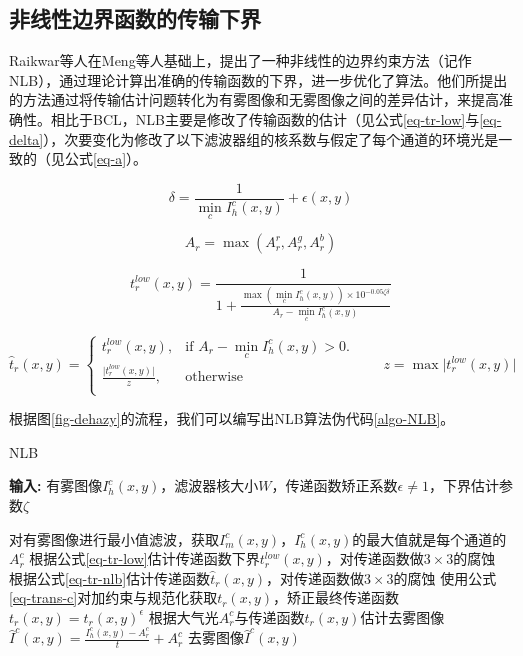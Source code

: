 \subsection{非线性边界函数的传输下界}
Raikwar等人\cite{raikwar.tapaswi2020}在Meng等人\cite{meng.pan201312}基础上，提出了一种非线性的边界约束方法（记作NLB），通过理论计算出准确的传输函数的下界，进一步优化了算法。他们所提出的方法通过将传输估计问题转化为有雾图像和无雾图像之间的差异估计，来提高准确性。相比于BCL，NLB主要是修改了传输函数的估计（见公式\eqref{eq-tr-low}与\eqref{eq-delta}），次要变化为修改了以下滤波器组的核系数与假定了每个通道的环境光是一致的（见公式\eqref{eq-a}）。

\begin{equation}
    \delta = \frac{1}{\min\limits_{c}I_h^c(x,y)} + \epsilon(x,y)
    \label{eq-delta}
\end{equation}

\begin{equation}
    A_r = \max{(A_r^r,A_r^g,A_r^b)}
    \label{eq-a}
\end{equation}

\begin{equation}
    t_r^{low}(x,y) = \frac{1}{1 + \frac{\max{(\min\limits_{c}I_h^c(x,y))}\times 10^{-0.05\zeta\delta}}{A_r - \min\limits_{c}I_h^c(x,y)}}
    \label{eq-tr-low}
\end{equation}

\begin{equation}
    \hat t_r(x,y) = \left\{\begin{matrix}t_r^{low}(x,y), & \text{if } A_r - \min\limits_{c}I_h^c(x,y) > 0.\\
        \frac{\lvert t_r^{low}(x,y) \rvert}{z}, & \text{otherwise}\\\end{matrix}\right. \qquad z = \max \lvert t_r^{low}(x,y) \rvert
    \label{eq-tr-nlb}
\end{equation}

根据图\ref{fig-dehazy}的流程，我们可以编写出NLB算法伪代码\ref{algo-NLB}。

\begin{algorithm}[ht]
    \caption{NLB}
    \label{algo-NLB}
    \textbf{输入:} 有雾图像$I_h^c(x,y)$，滤波器核大小$W$，传递函数矫正系数$\epsilon\neq1$，下界估计参数$\zeta$
    \begin{algorithmic}
    \State 对有雾图像进行最小值滤波，获取$I_m^c(x,y)$，$I_h^c(x,y)$的最大值就是每个通道的$A_r^c$
    \State 根据公式\eqref{eq-tr-low}估计传递函数下界$t_r^{low}(x,y)$，对传递函数做$3\times 3$的腐蚀
    \State 根据公式\eqref{eq-tr-nlb}估计传递函数$\hat t_r(x,y)$，对传递函数做$3\times 3$的腐蚀
    \State 使用公式\eqref{eq-trans-c}对加约束与规范化获取$t_r(x,y)$，矫正最终传递函数$t_r(x,y) = t_r(x,y)^\epsilon$
    \State 根据大气光$A_r^c$与传递函数$t_r(x,y)$估计去雾图像$\hat I^c(x,y) = \frac{I_h^c(x,y) - A_r^c}{t} + A_r^c$
    \State \Return 去雾图像$\hat I^c(x,y)$
    \end{algorithmic}
\end{algorithm}